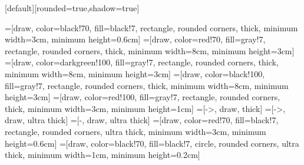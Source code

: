 \beamertemplatenavigationsymbolsempty
[default][rounded=true,shadow=true]

=[draw, color=black!70, fill=black!7, rectangle, rounded
corners, thick, minimum width=3cm, minimum height=0.6cm]
=[draw, color=red!70, fill=gray!7, rectangle, rounded
corners, thick, minimum width=8cm, minimum height=3cm]
=[draw, color=darkgreen!100, fill=gray!7, rectangle, rounded
corners, thick, minimum width=8cm, minimum height=3cm]
=[draw, color=black!100, fill=gray!7, rectangle, rounded
corners, thick, minimum width=8cm, minimum height=3cm]
=[draw, color=red!100, fill=gray!7, rectangle, rounded
corners, thick, minimum width=3cm, minimum height=1cm]
=[->, draw, thick]
=[->, draw, ultra thick]
=[-, draw, ultra thick]
=[draw, color=red!70, fill=black!7, rectangle, rounded
corners, ultra thick, minimum width=3cm, minimum height=0.6cm]
=[draw, color=black!70, fill=black!7, circle, rounded
corners, ultra thick, minimum width=1cm, minimum height=0.2cm]
\newcommand\framepicture[1]{
\begin{center}
		\begin{tikzpicture}
			\node[taskRect] at (0,3) {
			\begin{minipage}[t][4cm]{7cm}
		\texttt{[image: \#1]} 
		\end{minipage}
		};
	\end{tikzpicture}
\end{center}
}
\newcommand\drawDirectedGraph[2]{
\node[nUnit] (h) at (#2,#1) {h};
\node[nUnit] (v1) at (#2-1,#1-2) {v1};
\node[nUnit] (v2) at (#2+1,#1-2) {v2};
\draw[darrow] (v1) -- (h);
\draw[darrow] (v2) -- (h);
\draw[darrow] (h) -- (#2,#1+1);
}
\newcommand\drawUndirectedGraph[2]{
	\node[nUnit] (uh) at (#2,#1) {h};
	\node[nUnit] (uv1) at (#2-1,#1-2) {v1};
	\node[nUnit] (uv2) at (#2+1,#1-2) {v2};
	\draw[uarrow] (uv1) -- (uh);
	\draw[uarrow] (uv2) -- (uh);
}
\newcommand\drawRBM[2]{
	\node[nUnit] (uh0) at (#2-1.5,#1) {h0};
	\node[nUnit] (uh1) at (#2,#1) {h1};
	\node[nUnit] (uh2) at (#2+1.5,#1) {h2};
	\node[nUnit] (uv1) at (#2-1,#1-2) {v1};
	\node[nUnit] (uv2) at (#2+1,#1-2) {v2};
	\draw[uarrow] (uv1) -- (uh0);
	\draw[uarrow] (uv1) -- (uh1);
	\draw[uarrow] (uv1) -- (uh2);
	\draw[uarrow] (uv2) -- (uh0);
	\draw[uarrow] (uv2) -- (uh1);
	\draw[uarrow] (uv2) -- (uh2);
}

